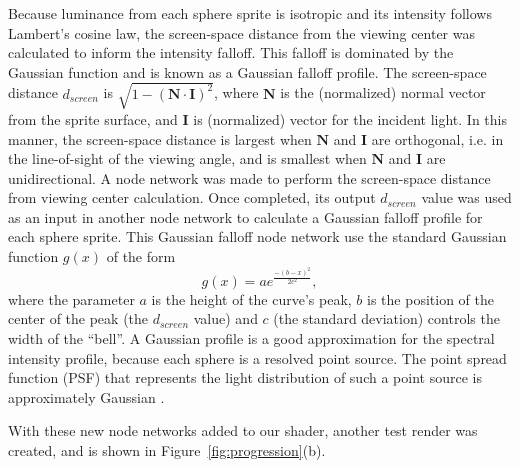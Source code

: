 \documentclass[fleqn,usenatbib,useAMS]{mnras}
\begin{document}
Because luminance from each sphere sprite is isotropic and its intensity follows Lambert's cosine law, the screen-space distance from the viewing center was calculated to inform the intensity falloff. This falloff is dominated by the Gaussian function and is known as a Gaussian falloff profile. The screen-space distance $d_{screen}$ is $\sqrt{1-(\textbf{N} \cdot \textbf{I})^2}$, where $\textbf{N}$ is the (normalized) normal vector from the sprite surface, and $\textbf{I}$ is (normalized) vector for the incident light. In this manner, the screen-space distance is largest when $\textbf{N}$ and $\textbf{I}$ are orthogonal, i.e. in the line-of-sight of the viewing angle, and is smallest when $\textbf{N}$ and $\textbf{I}$ are unidirectional. A node network was made to perform the screen-space distance from viewing center calculation. Once completed, its output $d_{screen}$ value was used as an input in another node network to calculate a Gaussian falloff profile for each sphere sprite. This Gaussian falloff node network use the standard Gaussian function $g(x)$ of the form
%
\begin{equation}
    g(x) = a e^\frac{-(b-x)^2}{2c^2},
\end{equation}
%
where the parameter $a$ is the height of the curve's peak, $b$ is the position of the center of the peak (the $d_{screen}$ value) and $c$ (the standard deviation) controls the width of the ``bell''. A Gaussian profile is a good approximation for the spectral intensity profile, because each sphere is a resolved point source. The point spread function (PSF) that represents the light distribution of such a point source is approximately Gaussian \citep{Sterken92}. \par

With these new node networks added to our shader, another test render was created, and is shown in Figure~\ref{fig:progression}(b).
%
%

\end{document}
